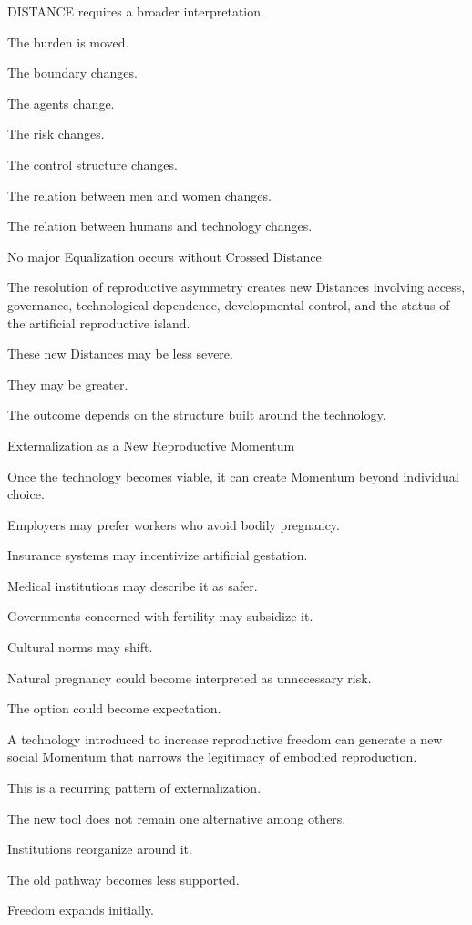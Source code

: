 DISTANCE requires a broader interpretation.

The burden is moved.

The boundary changes.

The agents change.

The risk changes.

The control structure changes.

The relation between men and women changes.

The relation between humans and technology changes.

No major Equalization occurs without Crossed Distance.

The resolution of reproductive asymmetry creates new Distances involving access, governance, technological dependence, developmental control, and the status of the artificial reproductive island.

These new Distances may be less severe.

They may be greater.

The outcome depends on the structure built around the technology.

Externalization as a New Reproductive Momentum

Once the technology becomes viable, it can create Momentum beyond individual choice.

Employers may prefer workers who avoid bodily pregnancy.

Insurance systems may incentivize artificial gestation.

Medical institutions may describe it as safer.

Governments concerned with fertility may subsidize it.

Cultural norms may shift.

Natural pregnancy could become interpreted as unnecessary risk.

The option could become expectation.

A technology introduced to increase reproductive freedom can generate a new social Momentum that narrows the legitimacy of embodied reproduction.

This is a recurring pattern of externalization.

The new tool does not remain one alternative among others.

Institutions reorganize around it.

The old pathway becomes less supported.

Freedom expands initially.

